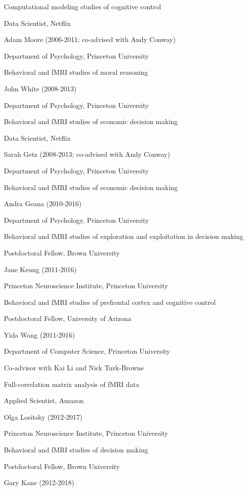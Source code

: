 \documentclass[10 pt]{article}
\begin{document}
Computational modeling studies of cognitive control

Data Scientist, Netflix
    \medskip

Adam Moore (2006-2011; co-advised with Andy Conway)

Department of Psychology, Princeton University

Behavioral and fMRI studies of moral reasoning
    \medskip

John White (2008-2013)

Department of Psychology, Princeton University

Behavioral and fMRI studies of economic decision making

Data Scientist, Netflix
    \medskip

Sarah Getz (2008-2013; co-advised with Andy Conway)

Department of Psychology, Princeton University

Behavioral and fMRI studies of economic decision making
    \medskip

Andra Geana (2010-2016)

Department of Psychology, Princeton University

Behavioral and fMRI studies of exploration and exploitation in decision making

Postdoctoral Fellow, Brown University
    \medskip

Jane Keung (2011-2016)

Princeton Neuroscience Institute, Princeton University

Behavioral and fMRI studies of prefrontal cortex and cognitive control

Postdoctoral Fellow, University of Arizona
    \medskip

Yida Wang (2011-2016)

Department of Computer Science, Princeton University

Co-advisor with Kai Li and Nick Turk-Browne

Full-correlation matrix analysis of fMRI data

Applied Scientist, Amazon
    \medskip

Olga Lositsky (2012-2017)

Princeton Neuroscience Institute, Princeton University

Behavioral and fMRI studies of decision making

Postdoctoral Fellow, Brown University
    \medskip

Gary Kane (2012-2018)
\end{document}
